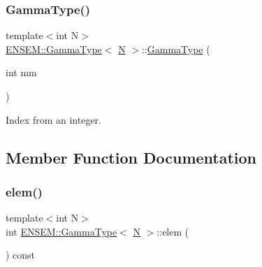 \mbox{\label{classENSEM_1_1GammaType_ab93a83aeee6b442968d78f30cb6b4a65}} 
\subsubsection{\texorpdfstring{GammaType()}{GammaType()}\hspace{0.1cm}{\footnotesize\ttfamily [4/4]}}
{\footnotesize\ttfamily template$<$int N$>$ \\
\mbox{\hyperlink{classENSEM_1_1GammaType}{E\+N\+S\+E\+M\+::\+Gamma\+Type}}$<$ \mbox{\hyperlink{operator__name__util_8cc_a7722c8ecbb62d99aee7ce68b1752f337}{N}} $>$\+::\mbox{\hyperlink{classENSEM_1_1GammaType}{Gamma\+Type}} (\begin{DoxyParamCaption}\item[{int}]{mm }\end{DoxyParamCaption})\hspace{0.3cm}{\ttfamily [inline]}}



Index from an integer. 



\subsection{Member Function Documentation}
\mbox{\label{classENSEM_1_1GammaType_a2813c3878cd269c7a37c588875682705}} 
\subsubsection{\texorpdfstring{elem()}{elem()}\hspace{0.1cm}{\footnotesize\ttfamily [1/2]}}
{\footnotesize\ttfamily template$<$int N$>$ \\
int \mbox{\hyperlink{classENSEM_1_1GammaType}{E\+N\+S\+E\+M\+::\+Gamma\+Type}}$<$ \mbox{\hyperlink{operator__name__util_8cc_a7722c8ecbb62d99aee7ce68b1752f337}{N}} $>$\+::elem (\begin{DoxyParamCaption}{ }\end{DoxyParamCaption}) const\hspace{0.3cm}{\ttfamily [inline]}}



